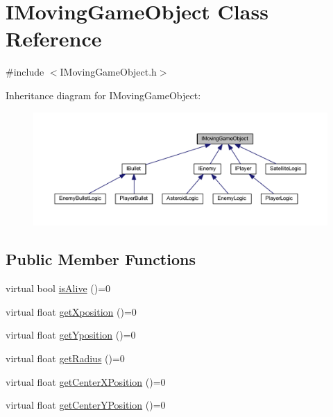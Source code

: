 \hypertarget{class_i_moving_game_object}{}\section{I\+Moving\+Game\+Object Class Reference}
\label{class_i_moving_game_object}


{\ttfamily \#include $<$I\+Moving\+Game\+Object.\+h$>$}



Inheritance diagram for I\+Moving\+Game\+Object\+:\nopagebreak
\begin{figure}[H]
\begin{center}
\leavevmode
\includegraphics[width=350pt]{class_i_moving_game_object__inherit__graph}
\end{center}
\end{figure}
\subsection*{Public Member Functions}
\begin{DoxyCompactItemize}
\item 
virtual bool \hyperlink{class_i_moving_game_object_ab88f75c872699dd1376e5e83f6188e34}{is\+Alive} ()=0
\item 
virtual float \hyperlink{class_i_moving_game_object_acc7f0195491b1843558c8c558cbc7363}{get\+Xposition} ()=0
\item 
virtual float \hyperlink{class_i_moving_game_object_a153c0017219e17262a9cceddba3f61d6}{get\+Yposition} ()=0
\item 
virtual float \hyperlink{class_i_moving_game_object_ab2120f126d088beda46654aa3ccfd705}{get\+Radius} ()=0
\item 
virtual float \hyperlink{class_i_moving_game_object_ae4e6c21094ef1e2db32729270c8a7999}{get\+Center\+X\+Position} ()=0
\item 
virtual float \hyperlink{class_i_moving_game_object_a075f69d69fd38dc02a0ec3c7b1cb0534}{get\+Center\+Y\+Position} ()=0
\end{DoxyCompactItemize}



